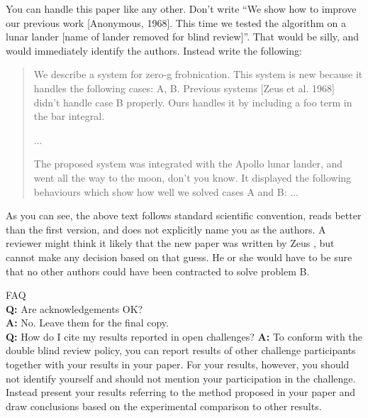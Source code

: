 \documentclass[10pt,twocolumn,letterpaper]{article}
\begin{document}
\begin{CJK}{UTF8}{bkai}
   You can handle this paper like any other.  Don't write ``We show how to
   improve our previous work [Anonymous, 1968].  This time we tested the
   algorithm on a lunar lander [name of lander removed for blind review]''.
   That would be silly, and would immediately identify the authors. Instead
   write the following:
   \begin{quotation}
      \noindent
      We describe a system for zero-g frobnication.  This
      system is new because it handles the following cases:
      A, B.  Previous systems [Zeus et al. 1968] didn't
      handle case B properly.  Ours handles it by including
      a foo term in the bar integral.

      ...

      The proposed system was integrated with the Apollo
      lunar lander, and went all the way to the moon, don't
      you know.  It displayed the following behaviours
      which show how well we solved cases A and B: ...
   \end{quotation}
   As you can see, the above text follows standard scientific convention,
   reads better than the first version, and does not explicitly name you as
   the authors.  A reviewer might think it likely that the new paper was
   written by Zeus \etal, but cannot make any decision based on that guess.
   He or she would have to be sure that no other authors could have been
   contracted to solve problem B.
   \medskip

   \noindent
   FAQ\medskip\\
   {\bf Q:} Are acknowledgements OK?\\
   {\bf A:} No.  Leave them for the final copy.\medskip\\
   {\bf Q:} How do I cite my results reported in open challenges?
   {\bf A:} To conform with the double blind review policy, you can report results of other challenge participants together with your results in your paper. For your results, however, you should not identify yourself and should not mention your participation in the challenge. Instead present your results referring to the method proposed in your paper and draw conclusions based on the experimental comparison to other results.\medskip\\




\end{CJK}
\end{document}
